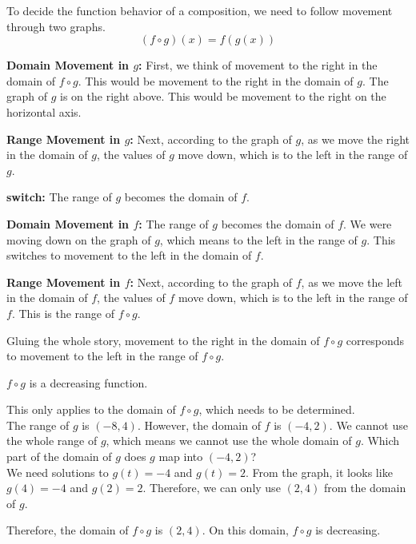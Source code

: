 \documentclass{ximera}
\begin{document}
To decide the function behavior of a composition, we need to follow movement through two graphs. \\



\[
(f \circ g)(x) = f(g(x))
\]



\textbf{\textcolor{blue!55!black}{Domain Movement in $g$:}}  First, we think of movement to the right in the domain of $f \circ g$.  This would be movement to the right in the domain of $g$.  The graph of $g$ is on the right above.  This would be movement to the right on the horizontal axis.



\textbf{\textcolor{blue!55!black}{Range Movement in $g$:}}  Next, according to the graph of $g$, as we move the right in the domain of $g$, the values of $g$ move down, which is to the left in the range of $g$.




\textbf{\textcolor{blue!55!black}{switch:}}   The range of $g$ becomes the domain of $f$.  


\textbf{\textcolor{blue!55!black}{Domain Movement in $f$:}}   The range of $g$ becomes the domain of $f$.  We were moving down on the graph of $g$, which means to the left in the range of $g$.  This switches to movement to the left in the domain of $f$.


\textbf{\textcolor{blue!55!black}{Range Movement in $f$:}}  Next, according to the graph of $f$, as we move the left in the domain of $f$, the values of $f$ move down, which is to the left in the range of $f$.  This is the range of $f \circ g$.




Gluing the whole story, movement to the right in the domain of $f \circ g$ corresponds to movement to the left in the range of $f \circ g$.

$f \circ g$ is a decreasing function.



\begin{observation}


This only applies to the domain of $f \circ g$, which needs to be determined. \\



The range of $g$ is $(-8, 4)$.  However, the domain of $f$ is $(-4, 2)$.   We cannot use the whole range of $g$, which means we cannot use the whole domain of $g$.  Which part of the domain of $g$ does $g$ map into $(-4, 2)$? \\


We need solutions to $g(t) = -4$ and $g(t) = 2$.  From the graph, it looks like $g(4) = -4$  and $g(2) = 2$. Therefore, we can only use $(2, 4)$ from the domain of $g$.


Therefore, the domain of $f \circ g$ is $(2, 4)$.  On this domain, $f \circ g$ is decreasing.



\end{observation}
\end{document}

